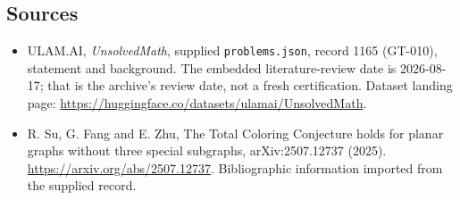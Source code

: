 \documentclass[11pt,a4paper]{article}
\begin{document}
\subsection{Sources}

{\small

\begin{itemize}

\item[\hypertarget{source:1165:1}{S1}] ULAM.AI, \emph{UnsolvedMath}, supplied \texttt{problems.json}, record 1165 (GT-010), statement and background. The embedded literature-review date is 2026-08-17; that is the archive’s review date, not a fresh certification. Dataset landing page: \url{https://huggingface.co/datasets/ulamai/UnsolvedMath}.

\item[\hypertarget{source:1165:2}{S2}] R. Su, G. Fang and E. Zhu, The Total Coloring Conjecture holds for planar graphs without three special subgraphs, arXiv:2507.12737 (2025). \url{https://arxiv.org/abs/2507.12737}. Bibliographic information imported from the supplied record.

\end{itemize}

}

\label{end:1165}
\end{document}
